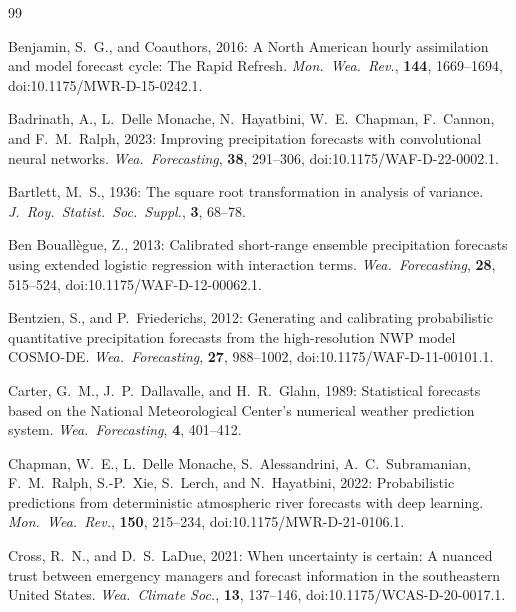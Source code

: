 \documentclass[11pt]{article}
\begin{document}
\begin{thebibliography}{99}

Benjamin, S.~G., and Coauthors, 2016:
A North American hourly assimilation and model forecast cycle: The Rapid Refresh.
\textit{Mon.\ Wea.\ Rev.}, \textbf{144}, 1669--1694,
doi:10.1175/MWR-D-15-0242.1.

Badrinath, A., L.\ Delle Monache, N.\ Hayatbini, W.~E.\ Chapman,
F.\ Cannon, and F.~M.\ Ralph, 2023:
Improving precipitation forecasts with convolutional neural networks.
\textit{Wea.\ Forecasting}, \textbf{38}, 291--306,
doi:10.1175/WAF-D-22-0002.1.

Bartlett, M.~S., 1936:
The square root transformation in analysis of variance.
\textit{J.\ Roy.\ Statist.\ Soc.\ Suppl.}, \textbf{3}, 68--78.

Ben Bouall\`egue, Z., 2013:
Calibrated short-range ensemble precipitation forecasts using
extended logistic regression with interaction terms.
\textit{Wea.\ Forecasting}, \textbf{28}, 515--524,
doi:10.1175/WAF-D-12-00062.1.

Bentzien, S., and P.\ Friederichs, 2012:
Generating and calibrating probabilistic quantitative precipitation
forecasts from the high-resolution NWP model COSMO-DE\@.
\textit{Wea.\ Forecasting}, \textbf{27}, 988--1002,
doi:10.1175/WAF-D-11-00101.1.

Carter, G.~M., J.~P.\ Dallavalle, and H.~R.\ Glahn, 1989:
Statistical forecasts based on the National Meteorological Center's
numerical weather prediction system.
\textit{Wea.\ Forecasting}, \textbf{4}, 401--412.

Chapman, W.~E., L.\ Delle Monache, S.\ Alessandrini,
A.~C.\ Subramanian, F.~M.\ Ralph, S.-P.\ Xie, S.\ Lerch, and
N.\ Hayatbini, 2022:
Probabilistic predictions from deterministic atmospheric river
forecasts with deep learning.
\textit{Mon.\ Wea.\ Rev.}, \textbf{150}, 215--234,
doi:10.1175/MWR-D-21-0106.1.

Cross, R.~N., and D.~S.\ LaDue, 2021:
When uncertainty is certain: A nuanced trust between emergency managers and
forecast information in the southeastern United States.
\textit{Wea.\ Climate Soc.}, \textbf{13}, 137--146,
doi:10.1175/WCAS-D-20-0017.1.


\end{thebibliography}
\end{document}

